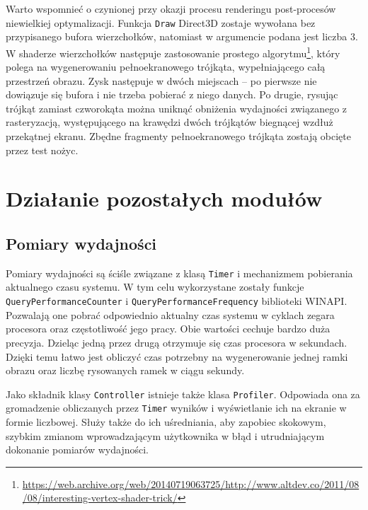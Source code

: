 		Warto wspomnieć o czynionej przy okazji procesu renderingu post-procesów niewielkiej optymalizacji. Funkcja \texttt{Draw} Direct3D zostaje wywołana bez przypisanego bufora wierzchołków, natomiast w argumencie podana jest liczba 3. W shaderze wierzchołków następuje zastosowanie prostego algorytmu\footnote{\url{https://web.archive.org/web/20140719063725/http://www.altdev.co/2011/08/08/interesting-vertex-shader-trick/}}, który polega na wygenerowaniu pełnoekranowego trójkąta, wypełniającego całą przestrzeń obrazu. Zysk następuje w dwóch miejscach -- po pierwsze nie dowiązuje się bufora i nie trzeba pobierać z niego danych. Po drugie, rysując trójkąt zamiast czworokąta można uniknąć obniżenia wydajności związanego z rasteryzacją, występującego na krawędzi dwóch trójkątów biegnącej wzdłuż przekątnej ekranu. Zbędne fragmenty pełnoekranowego trójkąta zostają obcięte przez test nożyc.
	
	\section{Działanie pozostałych modułów}
	\label{t:budowa:inne}
	
		\subsection{Pomiary wydajności}
		\label{t:budowa:inne:profiling}
		
		
		Pomiary wydajności są ściśle związane z klasą \texttt{Timer} i mechanizmem pobierania aktualnego czasu systemu. W tym celu wykorzystane zostały funkcje \texttt{QueryPerformanceCounter} i \texttt{QueryPerformanceFrequency} biblioteki WINAPI. Pozwalają one pobrać odpowiednio aktualny czas systemu w cyklach zegara procesora oraz częstotliwość jego pracy. Obie wartości cechuje bardzo duża precyzja. Dzieląc jedną przez drugą otrzymuje się czas procesora w sekundach. Dzięki temu łatwo jest obliczyć czas potrzebny na wygenerowanie jednej ramki obrazu oraz liczbę rysowanych ramek w ciągu sekundy.
		
		Jako składnik klasy \texttt{Controller} istnieje także klasa \texttt{Profiler}. Odpowiada ona za gromadzenie obliczanych przez \texttt{Timer} wyników i wyświetlanie ich na ekranie w formie liczbowej. Służy także do ich uśredniania, aby zapobiec skokowym, szybkim zmianom wprowadzającym użytkownika w błąd i utrudniającym dokonanie pomiarów wydajności.
	

